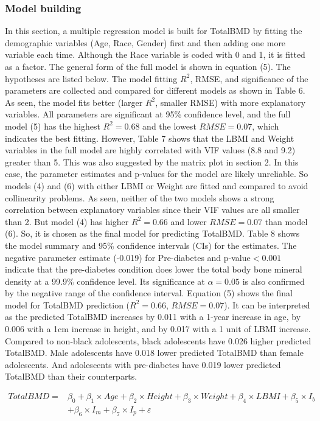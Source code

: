 \documentclass[11pt]{article}
\begin{document}
\subsubsection {Model building}
In this section, a multiple regression model is built for TotalBMD by fitting the demographic variables (Age, Race, Gender) first and then adding one more variable each time. Although the Race variable is coded with 0 and 1, it is fitted as a factor. The general form of the full model is shown in equation (5). The hypotheses are listed below. The model fitting $R^2$, RMSE, and significance of the parameters are collected and compared for different models as shown in Table 6. As seen, the model fits better (larger $R^2$, smaller RMSE) with more explanatory variables. All parameters are significant at 95\% confidence level, and the full model (5) has the highest $R^2 =0.68$ and the lowest $RMSE=0.07$, which indicates the best fitting. However, Table 7 shows that the LBMI and Weight variables in the full model are highly correlated with VIF values (8.8 and 9.2) greater than 5. This was also suggested by the matrix plot in section 2. In this case, the parameter estimates and p-values for the model are likely unreliable. So models (4) and (6) with either LBMI or Weight are fitted and compared to avoid collinearity problems. As seen, neither of the two models shows a strong correlation between explanatory variables since their VIF values are all smaller than 2. But model (4) has higher $R^2=0.66$ and lower $RMSE=0.07$ than model (6). So, it is chosen as the final model for predicting TotalBMD. Table 8 shows the model summary and 95\% confidence intervals (CIs) for the estimates. The negative parameter estimate (-0.019) for Pre-diabetes and p-value$<0.001$ indicate that the pre-diabetes condition does lower the total body bone mineral density at a 99.9\% confidence level. Its significance at $\alpha=0.05$ is also confirmed by the negative range of the confidence interval. Equation (5) shows the final model for TotalBMD prediction ($R^2=0.66$, $RMSE=0.07$). It can be interpreted as the predicted TotalBMD increases by 0.011 with a 1-year increase in age, by 0.006 with a 1cm increase in height, and by 0.017 with a 1 unit of LBMI increase. Compared to non-black adolescents, black adolescents have 0.026 higher predicted TotalBMD. Male adolescents have 0.018 lower predicted TotalBMD than female adolescents. And adolescents with pre-diabetes have 0.019 lower predicted TotalBMD than their counterparts.  

\begin{equation}
\begin{split}
TotalBMD = &\beta_0 + \beta_1\times Age + \beta_2\times Height + \beta_3\times Weight + \beta_4\times LBMI + \beta_5\times I_b\\
& + \beta_6\times I_m + \beta_7\times I_p + \varepsilon\\
\end{split}
\end{equation}
\end{document}
